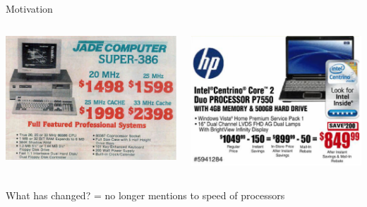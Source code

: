 \documentclass[10pt]{beamer}
\begin{document}

\begin{frame}{Motivation}
\begin{columns}[T] %
\begin{column}{.5\textwidth}
\includegraphics[width=1.05\linewidth]{img/old_ad}
\end{column}%
\hfill%
\begin{column}{.5\textwidth}
\includegraphics[width=\linewidth]{img/2006_ad}
\end{column}%
\end{columns}
What has changed?
 = no longer mentions to speed of processors
\end{frame}
\end{document}
